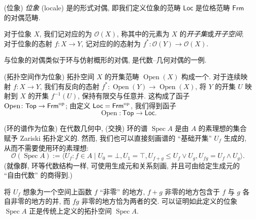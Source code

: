 \begin{definition}
	[label={locale-definition}]
	{(位象)}
	\emph{位象} (locale) 是\fm{}的形式对偶,
	即我们定义位象的范畴 $\mathsf {Loc}$ 是位格范畴 $\mathsf {Frm}$ 的对偶范畴.
	
	对于位象 $X$, 我们记对应的\fm{}为 $\mathcal O(X)$, 称其中的元素为 $X$ 的\emph{开子集}或\emph{开子空间}; 对于位象的态射 $f \colon X \to Y$,
	记对应的\fm{}的态射为 $f^* \colon \mathcal O(Y) \to \mathcal O(X)$.
\end{definition}

\begin{remark}
	{}
	\fm{}与位象的对偶类似于环与仿射概形的对偶,
	是代数--几何对偶的一例.
\end{remark}

\begin{example}
	{(拓扑空间作为位象)}
	拓扑空间 $X$ 的开集范畴 $\operatorname{Open}(X)$ 构成一个\fm{}.
	对于连续映射 $f \colon X \to Y$,
	我们有反向的\fm{}态射 $f^* \colon \operatorname{Open}(Y) \to \operatorname{Open}(X)$,
	将 $Y$ 的开集 $U$ 映射到 $X$ 的开集 $f^{-1}(U)$, 保持有限交与任意并.
	这构成了函子 $\operatorname{Open} \colon \mathsf {Top} \to \mathsf {Frm}^{\text{op}}$; 由定义 $\mathsf {Loc} = \mathsf {Frm}^{\text{op}}$, 我们得到函子 $$\operatorname{Open} \colon \mathsf {Top} \to \mathsf {Loc}.$$
\end{example}

\begin{example}
	{(环的谱作为位象)}
	在代数几何中, (交换) 环的谱 $\operatorname{Spec}A$ 是由 $A$ 的素理想的集合赋予 Zariski 拓扑定义的. 然而, 我们也可以直接刻画谱的 ``基础开集'' $U_f$ 生成的\fm, 从而不需要使用环的素理想\footnotemark:
	$$
	\mathcal O(\operatorname{Spec}A):= \big\langle U_f\colon f\in A\mid U_0 = \bot, U_1 = \top,
	U_{f+g} \leq U_f \vee U_g, U_{fg} = U_f \wedge U_g \big\rangle.
	$$
	(\fm{}就像群, 环等代数结构一样, 可使用生成元和关系刻画, 并且可由给定生成元的 ``自由代数'' 的商得到.)
	
	将 $U_f$ 想象为一个空间上函数 $f$ ``非零'' 的地方,
	$f+g$ 非零的地方包含于 $f$ 与 $g$ 各自非零的地方的并,
	而 $fg$ 非零的地方恰为两者的交.
	可以证明如此定义的位象 $\operatorname{Spec}A$ 正是传统上定义的拓扑空间 $\operatorname{Spec}A$.
\end{example}

